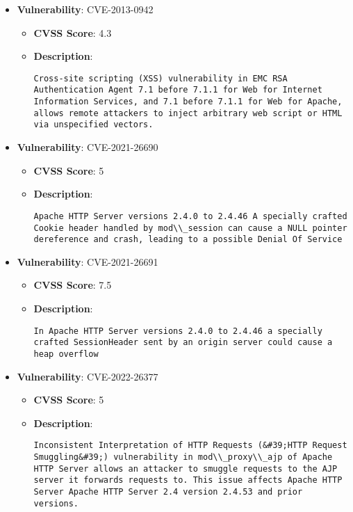 \documentclass{article}
\begin{document}
\begin{itemize}
        \item \textbf{Vulnerability}: CVE-2013-0942
        \begin{itemize}
            \item \textbf{CVSS Score}:  4.3 
            \item \textbf{Description}:
            \parbox[t]{0.9\linewidth}{
                \verb|Cross-site scripting (XSS) vulnerability in EMC RSA Authentication Agent 7.1 before 7.1.1 for Web for Internet Information Services, and 7.1 before 7.1.1 for Web for Apache, allows remote attackers to inject arbitrary web script or HTML via unspecified vectors.|
            }
        \end{itemize}
    
        \item \textbf{Vulnerability}: CVE-2021-26690
        \begin{itemize}
            \item \textbf{CVSS Score}:  5 
            \item \textbf{Description}:
            \parbox[t]{0.9\linewidth}{
                \verb|Apache HTTP Server versions 2.4.0 to 2.4.46 A specially crafted Cookie header handled by mod\\_session can cause a NULL pointer dereference and crash, leading to a possible Denial Of Service|
            }
        \end{itemize}
    
        \item \textbf{Vulnerability}: CVE-2021-26691
        \begin{itemize}
            \item \textbf{CVSS Score}:  7.5 
            \item \textbf{Description}:
            \parbox[t]{0.9\linewidth}{
                \verb|In Apache HTTP Server versions 2.4.0 to 2.4.46 a specially crafted SessionHeader sent by an origin server could cause a heap overflow|
            }
        \end{itemize}
    
        \item \textbf{Vulnerability}: CVE-2022-26377
        \begin{itemize}
            \item \textbf{CVSS Score}:  5 
            \item \textbf{Description}:
            \parbox[t]{0.9\linewidth}{
                \verb|Inconsistent Interpretation of HTTP Requests (&#39;HTTP Request Smuggling&#39;) vulnerability in mod\\_proxy\\_ajp of Apache HTTP Server allows an attacker to smuggle requests to the AJP server it forwards requests to. This issue affects Apache HTTP Server Apache HTTP Server 2.4 version 2.4.53 and prior versions.|
            }
        \end{itemize}
    

\end{itemize}
\end{document}
